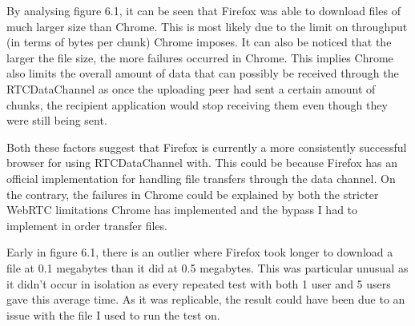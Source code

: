 \documentclass[]{report}
\begin{document}
			By analysing figure 6.1, it can be seen that Firefox was able to download files of much larger size than Chrome. This is most likely due to the limit on throughput (in terms of bytes per chunk) Chrome imposes. It can also be noticed that the larger the file size, the more failures occurred in Chrome. This implies Chrome also limits the overall amount of data that can possibly be received through the RTCDataChannel as once the uploading peer had sent a certain amount of chunks, the recipient application would stop receiving them even though they were still being sent. 
			
			Both these factors suggest that Firefox is currently a more consistently successful browser for using RTCDataChannel with. This could be because Firefox has an official implementation for handling file transfers through the data channel. On the contrary, the failures in Chrome could be explained by both the stricter WebRTC limitations Chrome has implemented and the bypass I had to implement in order transfer files.
			
			Early in figure 6.1, there is an outlier where Firefox took longer to download a file at 0.1 megabytes than it did at 0.5 megabytes. This was particular unusual as it didn't occur in isolation as every repeated test with both 1 user and 5 users gave this average time. As it was replicable, the result could have been due to an issue with the file I used to run the test on.
	
\end{document}
